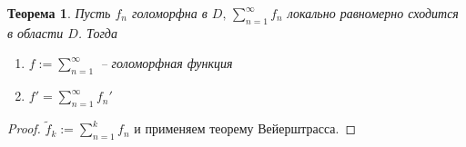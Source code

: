 \documentclass[a4paper,12pt]{article}
\theoremstyle{plain}
\newtheorem{theorem}{Теорема}[section]
\theoremstyle{definition}
\theoremstyle{remark}
\begin{document}
\begin{theorem}
	Пусть $f_n$ голоморфна в $D,\, \sum_{n = 1}^\infty f_n$ локально равномерно сходится в области $D$. Тогда
	\begin{enumerate}
		\item $f := \sum_{n = 1}^\infty$ -- голоморфная функция
		\item $f' = \sum_{n = 1}^\infty f_n'$
	\end{enumerate}
\end{theorem} 

\begin{proof}
	$\tilde{f}_k := \sum_{n = 1}^k f_n$ и применяем теорему Вейерштрасса.
\end{proof}
\end{document}
